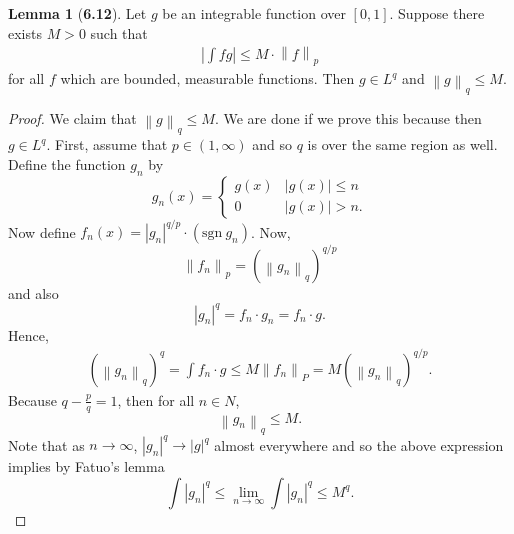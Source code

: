 \documentclass[12pt]{article}
\newcommand{\norm}[1]{\left\lVert #1 \right\rVert}
\newcommand{\abs}[1]{\left\lvert #1 \right\rvert}
\theoremstyle{definition}
\newtheorem*{lemma}{Lemma}
\begin{document}
\begin{lemma}[\textbf{6.12}]

    Let \( g \) be an integrable function over \( [0,1] \). Suppose there exists \( M >0 \) such that 
        \begin{align*}
            \left| \int fg \right| \leq M \cdot \norm{f}_{p}
        \end{align*}
    for all \( f \) which are bounded, measurable functions. 
    Then \( g \in L^q \) and \( \norm{g}_{q} \leq M \).

    \begin{proof}
        We claim that \( \norm{g}_{q} \leq M \). 
        We are done if we prove this because then \( g \in L^q \).
        First, assume that \( p \in (1, \infty) \) and so \( q \) is over the same region as well.
        Define the function \( g_n \) by
            \[
                g_n(x) = \begin{cases}
                    g(x) & |g(x)| \leq n \\
                    0 & |g(x)| > n.
                \end{cases}  
            \]
        Now define \( \displaystyle f_n(x) = \abs{g_n}^{q/p} \cdot (\mathrm{sgn} \ g_n) \).
        Now,
            \[
                \norm{f_n}_{p} = \left( \norm{g_n}_{q} \right)^{q/p}  
            \]
        and also 
            \[  
                \abs{g_n}^q = f_n \cdot g_n = f_n \cdot g.
            \]
    Hence,
            \begin{align*}
                \left( \norm{g_n}_q \right)^{q} = \int f_n \cdot g \leq M \norm{f_n}_{P}  = M \left( \norm{g_n}_q \right)^{q/p}.
            \end{align*}
    Because \( \displaystyle q - \frac{p}{q} = 1 \), then for all \( n \in N \),
            \[
                \norm{g_n}_q \leq M. 
            \]
    Note that as \( n \to \infty \), \( |g_n|^q \to |g|^q \) almost everywhere and so the above expression implies by Fatuo's lemma 
            \[
                \int \abs{g_n}^q \leq \lim_{n \to \infty}  \int \abs{g_n}^q \leq M^q.
            \]
    \end{proof}
    
\end{lemma}
\end{document}
